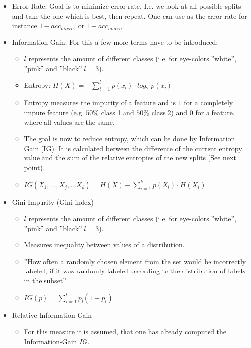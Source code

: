 \documentclass[12pt,a4paper]{article}
\begin{document}
\begin{itemize}
    \item Error Rate: Goal is to minimize error rate. I.e. we look at all possible splits and take the one which is best, then repeat. One can use as the error rate for instance \(1 - acc_{micro}\), or \(1 - acc_{macro}\).
    \item Information Gain: For this a few more terms have to be introduced:
        \begin{itemize}
            \item \(l\) represents the amount of different classes (i.e. for eye-colors ''white'', ''pink'' and ''black'' \(l = 3\)).
            \item Entropy: \(H(X) = - \sum_{i = 1}^l p(x_i) \cdot log_2 \; p(x_i)\)
            \item Entropy measures the impurity of a feature and is \(1\) for a completely impure feature (e.g. \(50\%\) class 1 and \(50\%\) class 2) and \(0\) for a feature, where all values are the same.
            \item The goal is now to reduce entropy, which can be done by Information Gain (IG). It is calculated between the difference of the current entropy value and the sum of the relative entropies of the new splits (See next point).
            \item \(IG(X_1,...,X_j,...X_k) = H(X) - \sum_{i = 1}^k p(X_i) \cdot H(X_i)\)
        \end{itemize}
    \item Gini Impurity (Gini index)
        \begin{itemize}
            \item \(l\) represents the amount of different classes (i.e. for eye-colors ''white'', ''pink'' and ''black'' \(l = 3\)).
            \item Measures inequality between values of a distribution.
            \item ''How often a randomly chosen element from the set would be incorrectly labeled, if it was randomly labeled according to the distribution of labels in the subset''
            \item \(IG(p) = \sum_{i = 1}^l p_i (1 - p_i)\)
        \end{itemize}
    \item Relative Information Gain
        \begin{itemize}
            \item For this measure it is assumed, that one has already computed the Information-Gain \(IG\).

\end{itemize}
\end{itemize}
\end{document}
